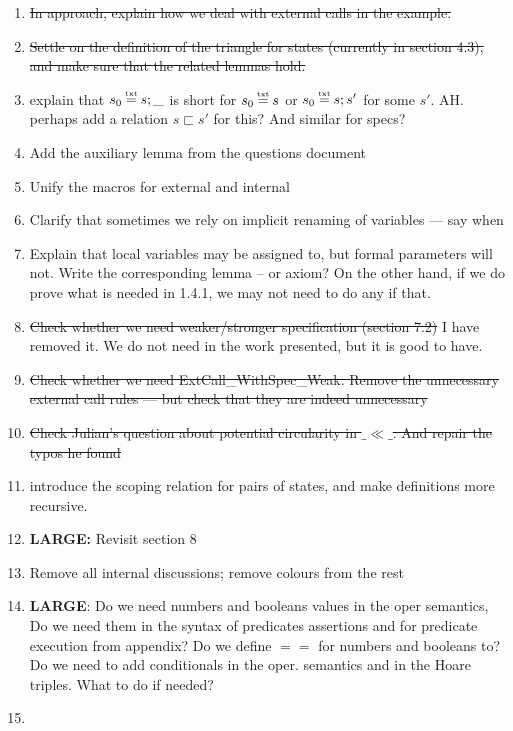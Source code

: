 \documentclass[acmsmall,review,anonymous]{acmart}\settopmatter{printfolios=true}
\begin{document}
\begin{enumerate}
\item
\st{In approach, explain how we deal with external calls in the  example.}
\item
\st{Settle on the definition of  the triangle for states (currently in section 4.3), and make sure that the related lemmas hold.}
\item
explain that $s_0\txteq s;\_$ is short for $s_0\txteq s$  or  $s_0\txteq s;s'$ for some $s'$. AH. perhaps add a relation $s \sqsubset s'$ for this? And similar for specs?
\item
Add the auxiliary lemma from the questions document
\item
Unify the macros for external and internal

\item
Clarify that sometimes we rely on implicit renaming of variables — say when

\item
Explain that local variables may be assigned to, but formal parameters will not. Write the corresponding lemma -- or axiom?
On the other hand, if we do prove what is needed in 1.4.1, we may not need to do any if that.

\item
\st{Check whether we need weaker/stronger specification (section 7.2)} I have removed it. We do not need in the work presented, but it is good to have.

\item
\st{Check whether we need ExtCall\_WithSpec\_Weak. Remove the unnecessary external call rules — but check that they are indeed unnecessary}

\item
\st{Check Julian's question about potential circularity in $\_\ll\_$. And repair the typos he found}
\item
introduce the scoping relation for pairs of states, and make definitions more recursive.

\item
\textbf{LARGE:} Revisit section 8

\item
Remove all internal discussions; remove colours from the rest

\item

\textbf{LARGE}: Do we need numbers and booleans values in the oper semantics, 
Do we need them in the syntax of predicates assertions and for predicate execution from appendix?
Do we define $==$ for numbers and booleans to?  
Do we need to add conditionals in the oper. semantics and in the Hoare triples. What to do if needed?
\item


\end{enumerate}
\end{document}
